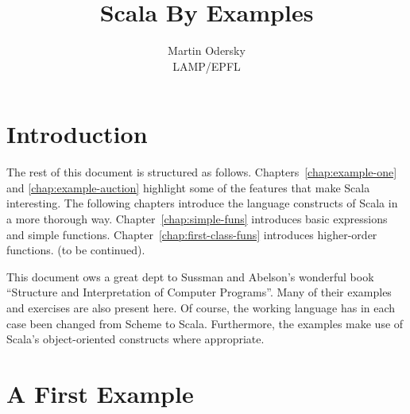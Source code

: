 \documentclass[11pt]{book}
\title{Scala By Examples}
\author{
Martin Odersky \\ LAMP/EPFL
}
\begin{document}
\maketitle


\chapter{\label{chap:intro}Introduction}



The rest of this document is structured as
follows. Chapters~\ref{chap:example-one} and
\ref{chap:example-auction} highlight some of the features that make
Scala interesting. The following chapters introduce the language
constructs of Scala in a more thorough
way. Chapter~\ref{chap:simple-funs} introduces basic expressions and
simple functions. Chapter~\ref{chap:first-class-funs} introduces
higher-order functions. (to be continued).

This document ows a great dept to Sussman and Abelson's wonderful book
``Structure and Interpretation of Computer
Programs''\cite{abelson-sussman:structure}. Many of their examples and
exercises are also present here. Of course, the working language has
in each case been changed from Scheme to Scala. Furthermore, the
examples make use of Scala's object-oriented constructs where
appropriate.


\chapter{\label{chap:example-one}A First Example}
\end{document}
